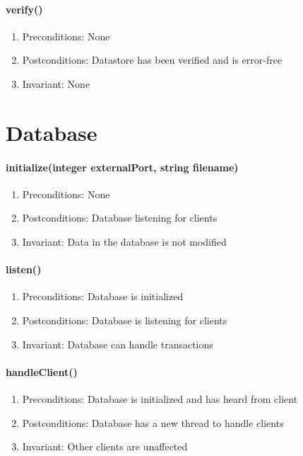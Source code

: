 \documentclass[a4paper]{report}
\begin{document}
	\paragraph{verify()}
		\begin{enumerate}
			\item Preconditions: None
			\item Postconditions: Datastore has been verified and is error-free
			\item Invariant: None
		\end{enumerate}

		

	\pagebreak

\section{Database}

	\begin{center}
	\end{center}

	\paragraph{initialize(integer externalPort, string filename)}
		\begin{enumerate}
			\item Preconditions: None
			\item Postconditions: Database listening for clients
			\item Invariant: Data in the database is not modified
		\end{enumerate}

	\paragraph{listen()}
		\begin{enumerate}
			\item Preconditions: Database is initialized
			\item Postconditions: Database is listening for clients
			\item Invariant: Database can handle transactions
		\end{enumerate}

	\paragraph{handleClient()}
		\begin{enumerate}
			\item Preconditions: Database is initialized and has heard from client
			\item Postconditions: Database has a new thread to handle clients
			\item Invariant: Other clients are unaffected
		\end{enumerate}
\end{document}
